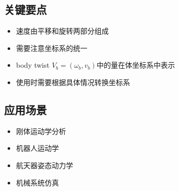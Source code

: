 \documentclass[12pt,a4paper]{article}
\begin{document}
\subsection{关键要点}

\begin{itemize}
\item 速度由平移和旋转两部分组成
\item 需要注意坐标系的统一
\item body twist $V_b = (\omega_b, v_b)$中的量在体坐标系中表示
\item 使用时需要根据具体情况转换坐标系
\end{itemize}

\subsection{应用场景}

\begin{itemize}
\item 刚体运动学分析
\item 机器人运动学
\item 航天器姿态动力学
\item 机械系统仿真
\end{itemize}
\end{document}
